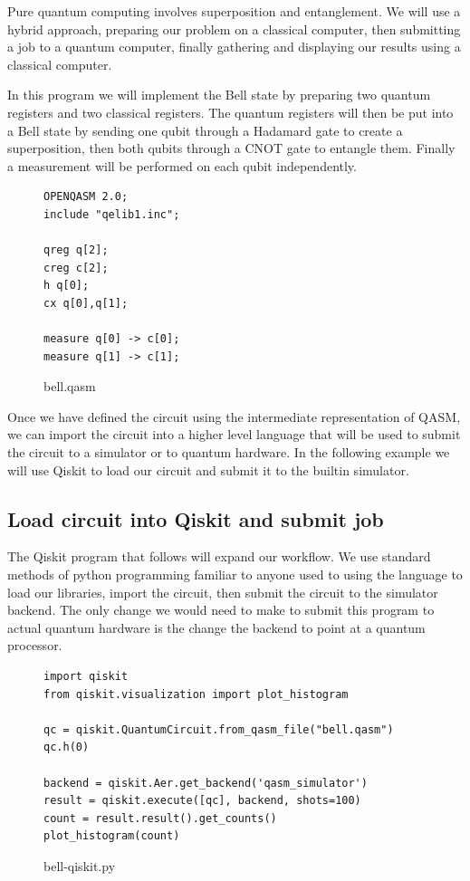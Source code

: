 \documentclass{article}
\begin{document}
Pure quantum computing involves superposition and entanglement. We will use a hybrid approach, preparing our problem on a classical computer, then submitting a job to a quantum computer, finally gathering and displaying our results using a classical computer. 

In this program we will implement the Bell state by preparing two quantum registers and two classical registers. The quantum registers will then be put into a Bell state by sending one qubit through a Hadamard gate to create a superposition, then both qubits through a CNOT gate to entangle them. Finally a measurement will be performed on each qubit independently. 
\begin{samepage}
\begin{figure}[H]
\begin{verbatim}
OPENQASM 2.0;
include "qelib1.inc";

qreg q[2];
creg c[2];
h q[0];
cx q[0],q[1];
  
measure q[0] -> c[0];
measure q[1] -> c[1];
\end{verbatim}
\caption{bell.qasm}
\end{figure}
\end{samepage}

Once we have defined the circuit using the intermediate representation of QASM, we can import the circuit into a higher level language that will be used to submit the circuit to a simulator or to quantum hardware. In the following example we will use Qiskit to load our circuit and submit it to the builtin simulator.

\subsection{Load circuit into Qiskit and submit job}

The Qiskit program that follows will expand our workflow. We use standard methods of python programming familiar to anyone used to using the language to load our libraries, import the circuit, then submit the circuit to the simulator backend. The only change we would need to make to submit this program to actual quantum hardware is the change the backend to point at a quantum processor.

\begin{samepage}
\begin{figure}[H]
\begin{verbatim}
import qiskit
from qiskit.visualization import plot_histogram

qc = qiskit.QuantumCircuit.from_qasm_file("bell.qasm")
qc.h(0)

backend = qiskit.Aer.get_backend('qasm_simulator')
result = qiskit.execute([qc], backend, shots=100)
count = result.result().get_counts()
plot_histogram(count)
\end{verbatim}
\caption{bell-qiskit.py}
\end{figure}
\end{samepage}
\end{document}
